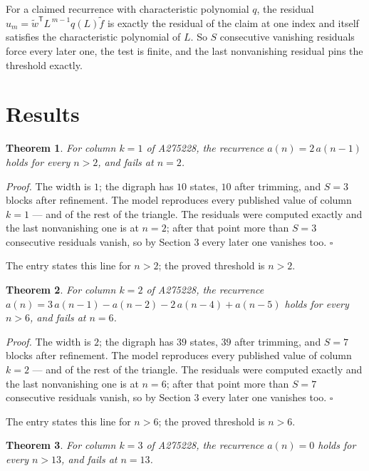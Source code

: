 \documentclass[11pt]{article}
\newtheorem{theorem}{Theorem}
\theoremstyle{definition}
\begin{document}
For a claimed recurrence with characteristic polynomial $q$, the residual $u_m = \tilde w^{\mathsf T}L^{\,m-1}q(L)\tilde f$ is exactly the residual of the claim at one index and itself satisfies the characteristic polynomial of $L$. So $S$ consecutive vanishing residuals force every later one, the test is finite, and the last nonvanishing residual pins the threshold exactly.

\section{Results}

\begin{theorem} For column $k = 1$ of A275228, the recurrence $a(n) = 2\,a(n-1)$ holds for every $n > 2$, and fails at $n = 2$.\end{theorem}

{\itshape Proof.} The width is $1$; the digraph has $10$ states, $10$ after trimming, and $S = 3$ blocks after refinement. The model reproduces every published value of column $k = 1$ --- and of the rest of the triangle. The residuals were computed exactly and the last nonvanishing one is at $n = 2$; after that point more than $S = 3$ consecutive residuals vanish, so by Section 3 every later one vanishes too. $\square$

The entry states this line for $n > 2$; the proved threshold is $n > 2$.

\begin{theorem} For column $k = 2$ of A275228, the recurrence $a(n) = 3\,a(n-1) - a(n-2) - 2\,a(n-4) + a(n-5)$ holds for every $n > 6$, and fails at $n = 6$.\end{theorem}

{\itshape Proof.} The width is $2$; the digraph has $39$ states, $39$ after trimming, and $S = 7$ blocks after refinement. The model reproduces every published value of column $k = 2$ --- and of the rest of the triangle. The residuals were computed exactly and the last nonvanishing one is at $n = 6$; after that point more than $S = 7$ consecutive residuals vanish, so by Section 3 every later one vanishes too. $\square$

The entry states this line for $n > 6$; the proved threshold is $n > 6$.

\begin{theorem} For column $k = 3$ of A275228, the recurrence $a(n) = 0$ holds for every $n > 13$, and fails at $n = 13$.\end{theorem}
\end{document}
